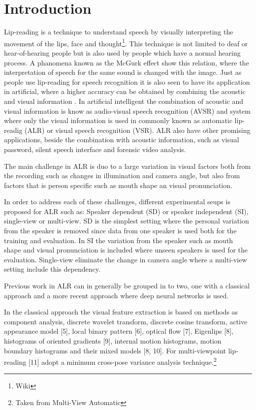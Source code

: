 \section{Introduction}
Lip-reading is a technique to understand speech by visually interpreting the movement of the lips, face and thought\footnote{Wiki}.
This technique is not limited to deaf or hear-of-hearing people but is also used by people which have a normal hearing process.
A phanomena known as the McGurk effect\cite{mcGurk} show this relation, where the interpretation of speech for the same sound is changed with the image.
Just as people use lip-reading for speech recognition it is also seen to have its application in artificial, where a higher accuracy can be obtained by combining the acoustic and visual information \cite{Ngiam2011}.
In artificial intelligent the combination of acoustic and visual information is know as audio-visual speech recognition (AVSR) and system where only the visual information is used in commonly known as automatic lip-readig (ALR) or visual speech recognition (VSR).
ALR also have other promising applications, beside the combination with acoustic information, such as visual password, silent speech interface and forensic video analysis.

The main challenge in ALR is duo to a large variation in visual factors both from the recording such as changes in illumination and camera angle\cite{Potamianos2003}, but also from factors that is person specific such as mouth shape an visual pronunciation. 

In order to address each of these challenges, different experimental seups is proposed for ALR such as:
Speaker dependent (SD) or speaker independent (SI), single-view or multi-view.
SD is the simplest setting where the personal variation from the speaker is removed since data from one speaker is used both for the training and evaluation.
In SI the variation from the speaker such as mouth shape and visual pronunciation is included where unseen speakers is used for the evaluation.
Single-view eliminate the change in camera angle where a multi-view setting include this dependency.

Previous work in ALR can in generally be grouped in to two, one with a classical approach and a more recent approach where deep neural networks is used.

In the classical approach the visual feature extraction is based on methods as
component analysis, discrete wavelet transform, discrete cosine transform, active appearance model [5], local binary pattern [6], optical flow [7], Eigenlips [8], histograms of oriented gradients [9], internal motion histograms, motion boundary histograms and their mixed models [8, 10]. 
For multi-viewpoint lip-reading [11] adopt a minimum cross-pose variance analysis technique.\footnote{Taken from Multi-View Automatic}

